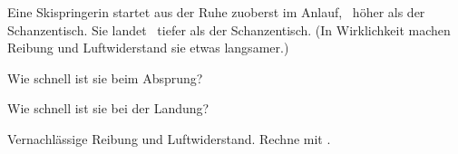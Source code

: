 Eine Skispringerin startet aus der Ruhe zuoberst im Anlauf, \hAO\ höher als der Schanzentisch. Sie landet \hLO\ tiefer als der Schanzentisch. (In Wirklichkeit machen Reibung und Luftwiderstand sie etwas langsamer.)

\begin{abcliste}
\abc
Wie schnell ist sie beim Absprung?

\abc
Wie schnell ist sie bei der Landung?
\end{abcliste}

Vernachlässige Reibung und Luftwiderstand. Rechne mit \gO.
